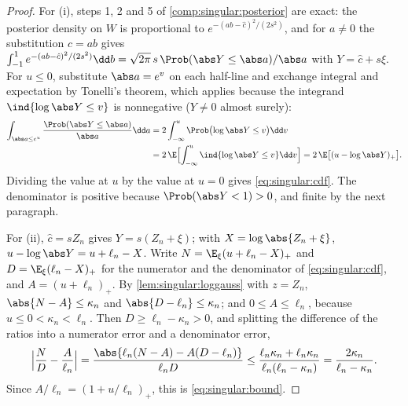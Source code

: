 \begin{refsection}
\begin{proof}
For (i), steps 1, 2 and 5 of \cref{comp:singular:posterior} are exact: the posterior density on $W$ is proportional to $e^{-(ab-\hat c)^2/(2s^2)}$, and for $a\ne0$ the substitution $c=ab$ gives $\int_{-1}^1e^{-(ab-\hat c)^2/(2s^2)}\dd b=\sqrt{2\pi}\,s\,\Prob(\abs Y\le\abs a)/\abs a$ with $Y=\hat c+s\xi$. For $u\le0$, substitute $\abs a=e^v$ on each half-line and exchange integral and expectation by Tonelli's theorem, which applies because the integrand $\ind\{\log\abs Y\le v\}$ is nonnegative ($Y\ne0$ almost surely):
\begin{align*}
\int_{\abs a\le e^u}\frac{\Prob(\abs Y\le\abs a)}{\abs a}\dd a&=2\int_{-\infty}^u\Prob\bigl(\log\abs Y\le v\bigr)\dd v\\
&=2\,\E\Bigl[\int_{-\infty}^u\ind\{\log\abs Y\le v\}\dd v\Bigr]=2\,\E\bigl[(u-\log\abs Y)_+\bigr].
\end{align*}
Dividing the value at $u$ by the value at $u=0$ gives \eqref{eq:singular:cdf}. The denominator is positive because $\Prob(\abs Y<1)>0$, and finite by the next paragraph.

For (ii), $\hat c=sZ_n$ gives $Y=s(Z_n+\xi)$; with $X=\log\abs{Z_n+\xi}$, $u-\log\abs Y=u+\ell_n-X$. Write $N=\E_\xi(u+\ell_n-X)_+$ and $D=\E_\xi(\ell_n-X)_+$ for the numerator and the denominator of \eqref{eq:singular:cdf}, and $A=(u+\ell_n)_+$. By \cref{lem:singular:loggauss} with $z=Z_n$, $\abs{N-A}\le\kappa_n$ and $\abs{D-\ell_n}\le\kappa_n$; and $0\le A\le\ell_n$, because $u\le0<\kappa_n<\ell_n$. Then $D\ge\ell_n-\kappa_n>0$, and splitting the difference of the ratios into a numerator error and a denominator error,
\[
\Bigl|\frac ND-\frac A{\ell_n}\Bigr|=\frac{\abs{\ell_n(N-A)-A(D-\ell_n)}}{\ell_nD}\le\frac{\ell_n\kappa_n+\ell_n\kappa_n}{\ell_n(\ell_n-\kappa_n)}=\frac{2\kappa_n}{\ell_n-\kappa_n}.
\]
Since $A/\ell_n=(1+u/\ell_n)_+$, this is \eqref{eq:singular:bound}.


\end{proof}
\end{refsection}
